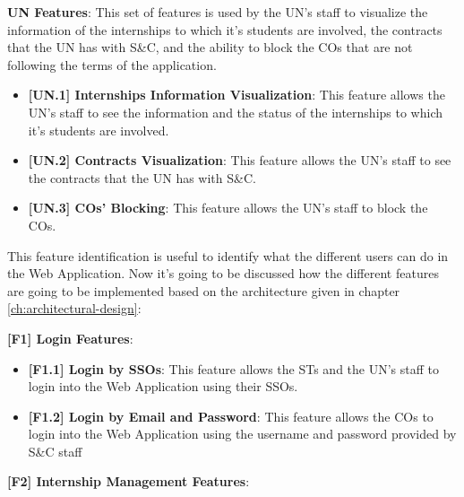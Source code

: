 \par \textbf{UN Features}: This set of features is used by the UN's staff to visualize the information of the
internships to which it's students are involved, the contracts that the UN has with S\&C, and the ability to block the
COs that are not following the terms of the application.

\begin{itemize}
    \item \textbf{[UN.1] Internships Information Visualization}: This feature allows the UN's staff to see the
    information and the status of the internships to which it's students are involved.
    \item \textbf{[UN.2] Contracts Visualization}: This feature allows the UN's staff to see the contracts that the UN
    has with S\&C.
    \item \textbf{[UN.3] COs' Blocking}: This feature allows the UN's staff to block the COs.
\end{itemize}


\par This feature identification is useful to identify what the different users can do in the Web Application. 
Now it's going to be discussed how the different features are going to be implemented based on the architecture given in
chapter \ref{ch:architectural-design}:

\par \textbf{[F1] Login Features}: 

\begin{itemize}
    \item \textbf{[F1.1] Login by SSOs}: This feature allows the STs and the UN's staff to login into the Web Application
    using their SSOs.
    \item \textbf{[F1.2] Login by Email and Password}: This feature allows the COs to login into the Web Application
    using the username and password provided by S\&C staff
\end{itemize}

\par \textbf{[F2] Internship Management Features}:

